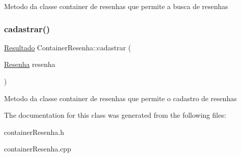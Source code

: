 Metodo da classe container de resenhas que permite a busca de resenhas \mbox{\label{classContainerResenha_a466bb33109ea836978c81bf227d5653b}} 
\subsubsection{\texorpdfstring{cadastrar()}{cadastrar()}}
{\footnotesize\ttfamily \hyperlink{classResultado}{Resultado} Container\+Resenha\+::cadastrar (\begin{DoxyParamCaption}\item[{\hyperlink{classResenha}{Resenha}}]{resenha }\end{DoxyParamCaption})}

Metodo da classe container de resenhas que permite o cadastro de resenhas 

The documentation for this class was generated from the following files\+:\begin{DoxyCompactItemize}
\item 
container\+Resenha.\+h\item 
container\+Resenha.\+cpp\end{DoxyCompactItemize}
